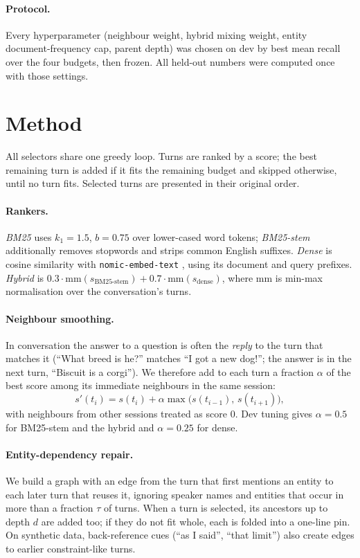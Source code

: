 \documentclass[11pt]{article}
\begin{document}
\paragraph{Protocol.}
Every hyperparameter (neighbour weight, hybrid mixing weight, entity document-frequency cap,
parent depth) was chosen on dev by best mean recall over the four budgets, then frozen. All
held-out numbers were computed once with those settings.

\section{Method}

All selectors share one greedy loop. Turns are ranked by a score; the best remaining turn is
added if it fits the remaining budget and skipped otherwise, until no turn fits. Selected turns
are presented in their original order.

\paragraph{Rankers.}
\emph{BM25} uses $k_1=1.5$, $b=0.75$ over lower-cased word tokens; \emph{BM25-stem} additionally
removes stopwords and strips common English suffixes. \emph{Dense} is cosine similarity with
\texttt{nomic-embed-text} \citep{nussbaum2024nomic}, using its document and query prefixes.
\emph{Hybrid} is $0.3\cdot\mathrm{mm}(s_{\text{BM25-stem}}) + 0.7\cdot\mathrm{mm}(s_{\text{dense}})$,
where $\mathrm{mm}$ is min-max normalisation over the conversation's turns.

\paragraph{Neighbour smoothing.}
In conversation the answer to a question is often the \emph{reply} to the turn that matches it
(``What breed is he?'' matches ``I got a new dog!''; the answer is in the next turn, ``Biscuit is
a corgi''). We therefore add to each turn a fraction $\alpha$ of the best score among its
immediate neighbours in the same session:
\[
  s'(t_i) = s(t_i) + \alpha \max\bigl(s(t_{i-1}),\, s(t_{i+1})\bigr),
\]
with neighbours from other sessions treated as score 0. Dev tuning gives $\alpha=0.5$ for
BM25-stem and the hybrid and $\alpha=0.25$ for dense.

\paragraph{Entity-dependency repair.}
We build a graph with an edge from the turn that first mentions an entity to each later turn
that reuses it, ignoring speaker names and entities that occur in more than a fraction
$\tau$ of turns. When a turn is selected, its ancestors up to depth $d$ are added too; if they do
not fit whole, each is folded into a one-line pin. On synthetic data, back-reference cues
(``as I said'', ``that limit'') also create edges to earlier constraint-like turns.
\end{document}
